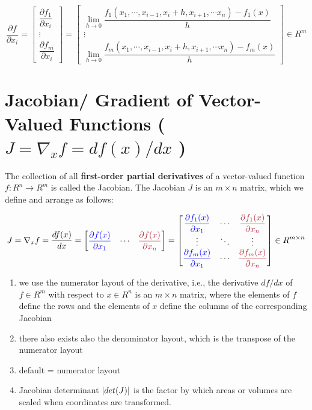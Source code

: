 \[
    \dfrac{\partial f}{\partial x_i}=
    \begin{bmatrix}
        \dfrac{\partial f_1}{\partial x_i} \\
        \vdots \\
        \dfrac{\partial f_m}{\partial x_i}
    \end{bmatrix} =
    \begin{bmatrix}
        \displaystyle\lim_{h \to 0} \dfrac{ f_1(x_1,\cdots ,x_{i-1},x_i+h,x_{i+1},\cdots x_n) - f_1(x)}{h} \\
        \vdots \\
        \displaystyle\lim_{h \to 0} \dfrac{f_m(x_1,\cdots ,x_{i-1},x_i+h,x_{i+1},\cdots x_n) - f_m(x)}{h}
    \end{bmatrix}
    \in R^m
\]


\section{Jacobian/ Gradient of Vector-Valued Functions ( $J = \nabla_x f = df(x)/dx$ )}\label{Jacobian/ Gradient of Vector-Valued Functions}

The collection of all \textbf{first-order partial derivatives} of a vector-valued function $f : R^n \to R^m$ is called the Jacobian. The Jacobian $J$ is an $m \times n$ matrix, which we define and arrange as follows:

\[
    J = \nabla_x f =
    \dfrac{df(x)}{dx} =
    \begin{bmatrix}
        \textcolor{blue}{\dfrac{\partial f(x)}{\partial x_1}} &
        \cdots &
        \textcolor{Maroon}{\dfrac{\partial f(x)}{\partial x_n}}
    \end{bmatrix} =
    \begin{bmatrix}
        \textcolor{blue}{\dfrac{\partial f_1(x)}{\partial x_1}} &
        \cdots &
        \textcolor{Maroon}{\dfrac{\partial f_1(x)}{\partial x_n}}\\
        \vdots & \ddots & \vdots \\
        \textcolor{blue}{\dfrac{\partial f_m(x)}{\partial x_1}} &
        \cdots &
        \textcolor{Maroon}{\dfrac{\partial f_m(x)}{\partial x_n}}\\
    \end{bmatrix}
    \in R^{m\times n}
\]

\begin{enumerate}
    \item we use the numerator layout of the derivative, i.e., the derivative $df/dx$ of $f \in R^m$ with respect to $x \in R^n$ is an $m \times n$ matrix, where the elements of $f$ define the rows and the elements of $x$ define the columns of the corresponding Jacobian

    \item there also exists also the denominator layout, which is the transpose of the numerator layout

    \item default = numerator layout

    \item Jacobian determinant $\left| det(J) \right|$ is the factor by which areas or volumes are scaled when coordinates are transformed.
\end{enumerate}



